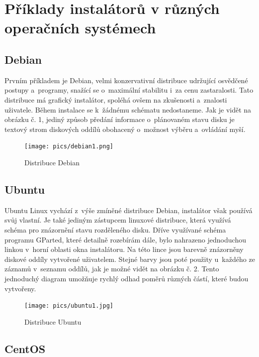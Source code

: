 \documentclass[color,table,oneside,nolot,nolof]{fithesis}
\begin{document}
\section{Příklady instalátorů v různých operačních systémech}

\subsection{Debian}

Prvním příkladem je Debian, velmi konzervativní distribuce udržující osvědčené postupy a~programy, snažící se o~maximální stabilitu i~za cenu zastaralosti. 
Tato distribuce má grafický instalátor, spoléhá ovšem na zkušenosti a~znalosti uživatele. Během instalace se k~žádnému schématu nedostaneme. Jak je vidět na obrázku č. 1, jediný způsob předání 
informace o~plánovaném stavu disku je textový strom diskových oddílů obohacený o~možnost výběru a~ovládání myší.

\begin{figure}[hb]
	\caption{Distribuce Debian}
	\centering
	\texttt{[image: pics/debian1.png]}
\end{figure}

\subsection{Ubuntu}

Ubuntu Linux vychází z~výše zmíněné distribuce Debian, instalátor však používá svůj vlastní. Je také jediným zástupcem linuxové distribuce, která využívá  schéma 
pro znázornění stavu rozděleného disku. Dříve využívané schéma programu GParted, které detailně rozebírám dále, bylo nahrazeno jednoduchou linkou v~horní oblasti okna instalátoru. Na této lince 
jsou barevně znázorněny diskové 
oddíly vytvořené uživatelem. Stejné barvy jsou poté použity u~každého ze záznamů v~seznamu oddílů, jak je možné vidět na obrázku č. 2. Tento jednoduchý diagram umožňuje rychlý odhad poměrů různých 
částí, které budou vytvořeny.

\begin{figure}[hb]
	\label{fig:ubuntu}
	\caption{Distribuce Ubuntu}
	\centering
	\texttt{[image: pics/ubuntu1.jpg]}
\end{figure}

\subsection{CentOS}
\end{document}
